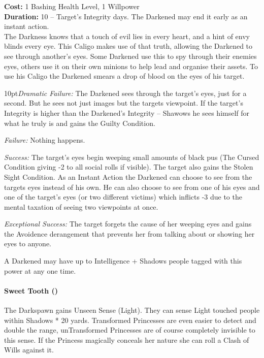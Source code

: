 \noindent \textbf{Cost:} 1 Bashing Health Level, 1 Willpower\\

\noindent \textbf{Duration:} 10 – Target's Integrity days. The Darkened may end it early as an instant action.\\

\noindent The Darkness knows that a touch of evil lies in every heart, and a hint of envy blinds every eye. This Caligo makes use of that truth, allowing the Darkened to see through another's eyes. Some Darkened use this to spy through their enemies eyes, others use it on their own minions to help lead and organise their assets. To use his Caligo the Darkened smears a drop of blood on the eyes of his target.

    \begin{myindentpar}{10pt}\emph{Dramatic Failure:} The Darkened sees through the target's eyes, just for a second. But he sees not just images but the targets viewpoint. If the target's Integrity is higher than the Darkened's Integrity – Shawows he sees himself for what he truly is and gains the Guilty Condition.
    
    \emph{Failure:} Nothing happens.
    
    \emph{Success:} The target's eyes begin weeping small amounts of black pus (The Cursed Condition giving -2 to all social rolls if visible). The target also gains the Stolen Sight Condition. As an Instant Action the Darkened can choose to see from the targets eyes instead of his own. He can also choose to see from one of his eyes and one of the target's eyes (or two different victims) which inflicts -3 due to the mental taxation of seeing two viewpoints at once.
    
    \emph{Exceptional Success:} The target forgets the cause of her weeping eyes and gains the Avoidence derangement that prevents her from talking about or showing her eyes to anyone.\end{myindentpar}

\noindent A Darkened may have up to Intelligence + Shadows people tagged with this power at any one time.\\


\paragraph*{Sweet Tooth (\textbullet)}

The Darkspawn gains Unseen Sense (Light). They can sense Light touched people within Shadows * 20 yards. Transformed Princesses are even easier to detect and double the range, unTransformed Princesses are of course completely invisible to this sense. If the Princess magically conceals her nature she can roll a Clash of Wills against it. 

